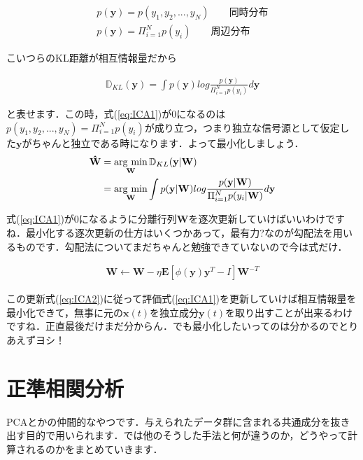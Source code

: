 \documentclass[11pt,a4paper,uplatex]{ujreport}
\newcommand{\argmin}{\mathop{\rm arg~min}\limits}
\begin{document}
\begin{eqnarray}
p (\mathbf{y}) = p(y_1, y_2,...,y_N) \qquad \text{同時分布}\\
p (\mathbf{y}) = \Pi_{i=1}^N p(y_i) \qquad \text{周辺分布}
\end{eqnarray}

こいつらのKL距離が相互情報量だから

\begin{eqnarray}
\label{eq:ICA1}
\mathbb{D}_{KL}(\mathbf{y}) = \int p(\mathbf{y}) log \frac{p(\mathbf{y})}{\Pi_{i=1}^N p(y_i)} d\mathbf{y}
\end{eqnarray}

と表せます．この時，式(\ref{eq:ICA1})が0になるのは$p(y_1, y_2,...,y_N) =\Pi_{i=1}^N p(y_i) $が成り立つ，つまり独立な信号源として仮定した$\mathbf{y}$がちゃんと独立である時になります．よって最小化しましょう．\\

\begin{align}
\label{eq:ICA2}
\mathbf{\hat W} &= \argmin_{\mathbf{W}} \mathbb{D}_{KL}(\mathbf{y}|\mathbf{W}) \nonumber \\
&= \argmin_{\mathbf{W}} \int p(\mathbf{y}|\mathbf{W}) log \frac{p(\mathbf{y}|\mathbf{W})}{\Pi_{i=1}^N p(y_i|\mathbf{W})} d\mathbf{y}
\end{align}

式(\ref{eq:ICA1})が0になるように分離行列$\mathbf{W}$を逐次更新していけばいいわけですね．最小化する逐次更新の仕方はいくつかあって，最有力?なのが勾配法を用いるものです．勾配法についてまだちゃんと勉強できていないので今は式だけ．

\begin{eqnarray}
\label{eq:ICA3}
\mathbf{W} \leftarrow \mathbf{W} - \eta \mathbf{E}[\phi (\mathbf{y})\mathbf{y}^T - I]\mathbf{W}^{-T}
\end{eqnarray}

この更新式(\ref{eq:ICA2})に従って評価式(\ref{eq:ICA1})を更新していけば相互情報量を最小化できて，無事に元の$\mathbf{x}(t)$を独立成分$\mathbf{y}(t)$を取り出すことが出来るわけですね．正直最後だけまだ分からん．でも最小化したいってのは分かるのでとりあえずヨシ！

\section{正準相関分析}
PCAとかの仲間的なやつです．与えられたデータ群に含まれる共通成分を抜き出す目的で用いられます．では他のそうした手法と何が違うのか，どうやって計算されるのかをまとめていきます．\\
\end{document}
